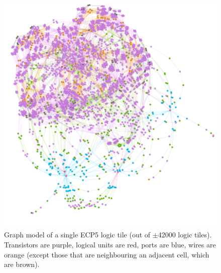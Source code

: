 \begin{figure}
\centering
\includegraphics[width=1\textwidth]{images/gephiScreenshot.png}
\caption{Graph model of a single ECP5 logic tile (out of $\pm$42000 logic tiles). Transistors are purple, logical units are red, ports are blue, wires are orange (except those that are neighbouring an adjacent cell, which are brown).}
\label{fig:ECPTGephi}
\end{figure}




